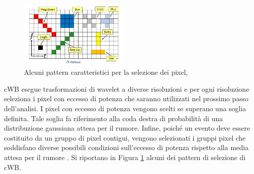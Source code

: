 \begin{figure}
	\vspace{-18pt}
	\begin{center}
		\includegraphics[width=0.475\textwidth]{figures/Capitolo_2/wavepacket_patterns.png}
	\end{center}
	\vspace{-5pt}
	\caption{Alcuni pattern caratteristici per la selezione dei pixel, \cite{cWB_Manual}}
	\label{fig:patterns}
	\vspace{-15pt}
\end{figure}
cWB esegue trasformazioni di wavelet a diverse risoluzioni e per ogni risoluzione seleziona i pixel con eccesso di potenza che saranno utilizzati nel prossimo passo dell'analisi. I pixel con eccesso di potenza vengono scelti se superano una soglia definita. Tale soglia fa riferimento alla coda destra di probabilità di una distribuzione gaussiana attesa per il rumore. Infine, poiché un evento deve essere costituito da un gruppo di pixel contigui, vengono selezionati i gruppi pixel che soddisfano diverse possibili condizioni sull'eccesso di potenza rispetto alla media attesa per il rumore \cite{cWB_Manual}. Si riportano in Figura \ref{fig:patterns} alcuni dei pattern di selezione di cWB.
%
